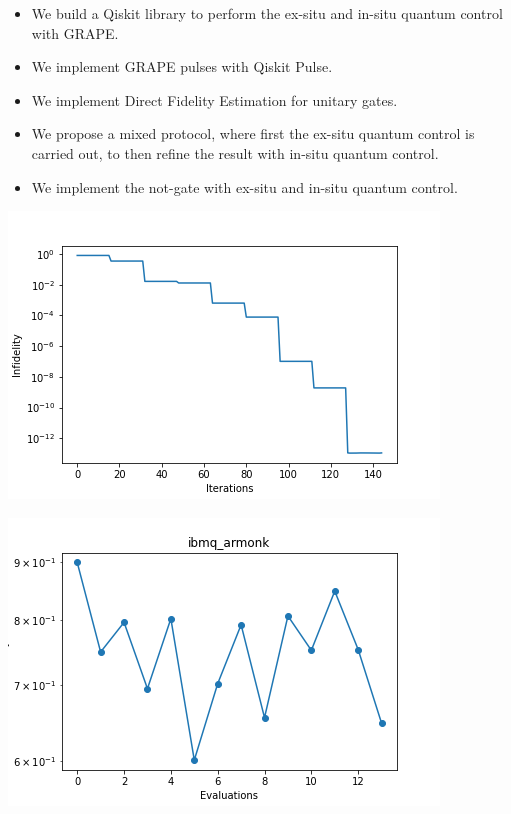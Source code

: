 \documentclass[12pt,aspectratio=169]{beamer}
\begin{document}
	\begin{frame}
		\begin{itemize}
			\item We build a Qiskit library to perform the ex-situ and in-situ quantum control with GRAPE.\\
			\vspace{0.1cm}
			\item We implement GRAPE pulses with Qiskit Pulse.
			\vspace{0.1cm}
			\item We implement Direct Fidelity Estimation for unitary gates.
			\vspace{0.1cm}
			\item We propose a mixed protocol, where first the ex-situ quantum control is carried out, to then refine the result with in-situ quantum control.\\
			\vspace{0.1cm}
			\item We implement the not-gate with ex-situ and in-situ quantum control.
		\end{itemize}
		
	\end{frame}
	
	\begin{frame}
		\centering
		\includegraphics[scale=0.8]{infidelity.png}
	\end{frame}
	
	\begin{frame}
		\centering
		\includegraphics[scale=0.8]{experiment.png}
	\end{frame}
	
	
\end{document}
